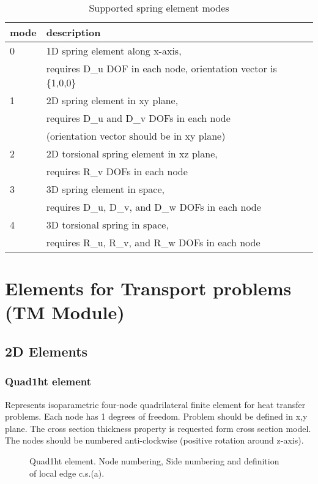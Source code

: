 \documentclass[a4paper]{article}
\begin{document}
\begin{table}
  \centering
  \begin{tabular}{lll}
    \hline
    mode & description\\
    \hline
    0 & 1D spring element along x-axis,\\
    & requires D\_u DOF in each node, orientation vector is \{1,0,0\}\\
    1 & 2D spring element in xy plane,\\
    & requires D\_u and D\_v DOFs in each node \\
    & (orientation vector should be in xy plane)\\
    2 & 2D torsional spring element in xz plane,\\
    & requires R\_v DOFs in each node\\
    3 & 3D spring element in space,\\
    & requires D\_u, D\_v, and D\_w DOFs in each node\\
    4 & 3D torsional spring in space,\\
    & requires R\_u, R\_v, and R\_w DOFs in each node\\
    \hline
  \end{tabular}
  \caption{Supported spring element modes } \label{spring_mode_table}
\end{table}

\section{Elements for Transport problems\\(TM Module)}
\subsection{2D Elements}
\subsubsection{Quad1ht element}
\label{Quad1ht}
Represents isoparametric four-node quadrilateral finite element for
heat transfer problems. Each node has 1 degrees of freedom.
Problem should be defined in x,y plane. The cross section thickness
property is requested form cross section model.
The nodes should be numbered anti-clockwise (positive rotation around
z-axis). 

\begin{figure}[tb]
 \centering
 \begin{makeimage}
  
 \end{makeimage}

 \caption{Quad1ht element. Node numbering, Side numbering and
 definition of local edge c.s.(a).}
 \label{Quad1htfig}
\end{figure}
\end{document}
